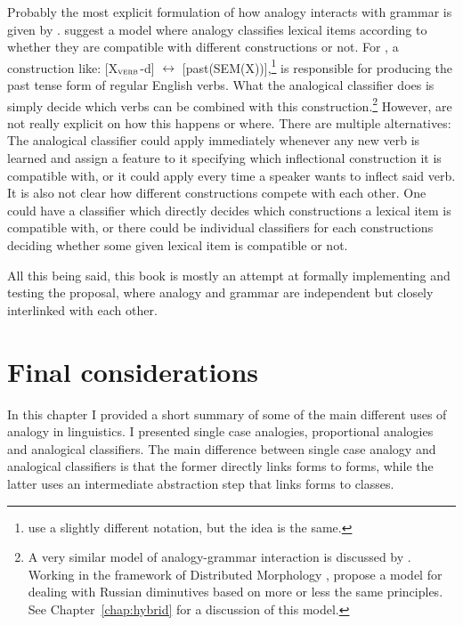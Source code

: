 Probably the most explicit formulation of how analogy interacts with grammar is given by \textcite{Bybee.2015}. \citeauthor{Bybee.2015} suggest a model where analogy classifies lexical items according to whether they are compatible with different constructions or not. For \textcite{Bybee.2015}, a construction like: [X$_{\textsc{verb}}$-d] $\leftrightarrow$ [past(SEM(X))],\footnote{\textcite{Bybee.2015} use a slightly different notation, but the idea is the same.} is responsible for producing the past tense form of regular English verbs. What the analogical classifier does is simply decide which verbs can be combined with this construction.\footnote{A very similar model of analogy-grammar interaction is discussed by \textcite{Gouskova.2015}. Working in the framework of Distributed Morphology \autocite{Halle.1993}, \textcite{Gouskova.2015} propose a model for dealing with Russian diminutives based on more or less the same principles. See Chapter~\ref{chap:hybrid} for a discussion of this model.} However, \textcite{Bybee.2015} are not really explicit on how this happens or where. There are multiple alternatives: The analogical classifier could apply immediately whenever any new verb is learned and assign a feature to it specifying which inflectional construction it is compatible with, or it could apply every time a speaker wants to inflect said verb. It is also not clear how different constructions compete with each other. One could have a classifier which directly decides which constructions a lexical item is compatible with, or there could be individual classifiers for each constructions deciding whether some given lexical item is compatible or not.

All this being said, this book is mostly an attempt at formally implementing and testing the \citeauthor{Bybee.2015} proposal, where analogy and grammar are independent but closely interlinked with each other.

\section{Final considerations}

\largerpage
In this chapter I provided a short summary of some of the main different uses of analogy in linguistics. I presented single case analogies, proportional analogies and analogical classifiers. The main difference between single case analogy and analogical classifiers is that the former directly links forms to forms, while the latter uses an intermediate abstraction step that links forms to classes.

